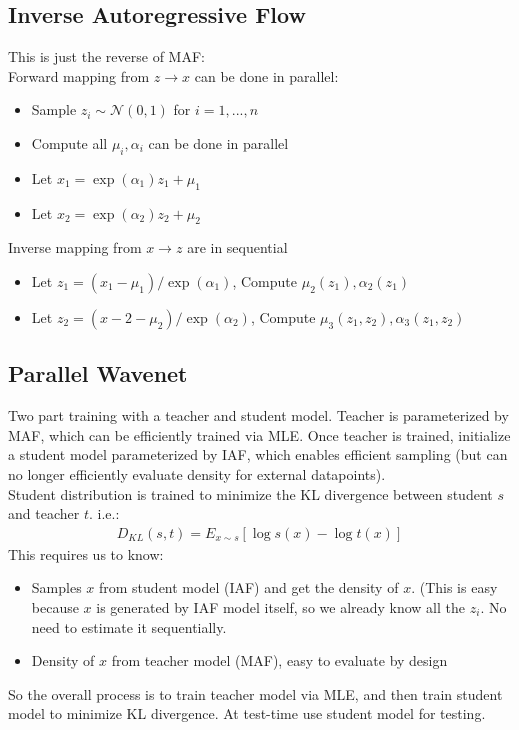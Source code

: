 \subsection{Inverse Autoregressive Flow} 
This is just the reverse of MAF: \\
Forward mapping from $z \to x$ can be done in parallel: 
    \begin{itemize}
        \item Sample $z_i \sim \mathcal{N}(0,1)$ for $i = 1,...,n$
        \item Compute all $\mu_i, \alpha_i$ can be done in parallel
        \item Let $x_1 = \exp(\alpha_1)z_1 + \mu_1$
        \item Let $x_2 = \exp(\alpha_2)z_2 + \mu_2$
    \end{itemize}
Inverse mapping from $x \to z$ are in sequential 
    \begin{itemize}
        \item Let $z_1 = (x_1 - \mu_1) / \exp(\alpha_1)$, Compute $\mu_2(z_1), \alpha_2(z_1)$
        \item Let $z_2 = (x-2 - \mu_2) / \exp(\alpha_2)$, Compute $\mu_3(z_1, z_2), \alpha_3(z_1, z_2)$
    \end{itemize}

\subsection{Parallel Wavenet}
Two part training with a teacher and student model. Teacher is parameterized by MAF, which can be efficiently trained via MLE. Once teacher is trained, initialize a student model parameterized by IAF, which enables efficient sampling (but can no longer efficiently evaluate density for external datapoints).\\
Student distribution is trained to minimize the KL divergence between student $s$ and teacher $t$. i.e.: 
    \begin{align*}
        D_{KL}(s,t) = E_{x\sim s}[\log s(x) - \log t(x)]
    \end{align*}
This requires us to know: 
    \begin{itemize}
        \item Samples $x$ from student model (IAF) and get the density of $x$. (This is easy because $x$ is generated by IAF model itself, so we already know all the $z_i$. No need to estimate it sequentially. 
        \item Density of $x$ from teacher model (MAF), easy to evaluate by design
    \end{itemize}
So the overall process is to train teacher model via MLE, and then train student model to minimize KL divergence. At test-time use student model for testing. 


